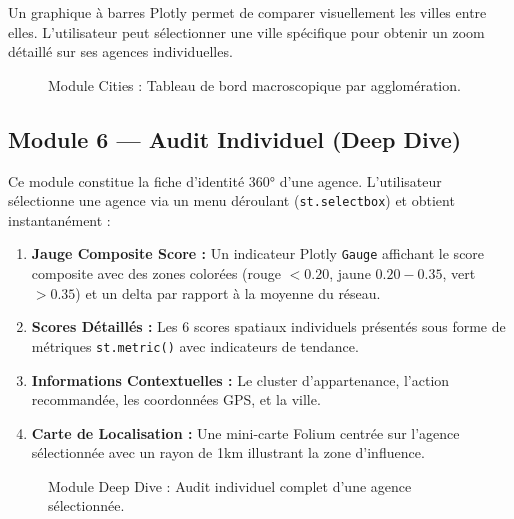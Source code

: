 Un graphique à barres Plotly permet de comparer visuellement les villes entre elles. L'utilisateur peut sélectionner une ville spécifique pour obtenir un zoom détaillé sur ses agences individuelles.

\begin{figure}[h]
    \centering
    \caption{Module Cities : Tableau de bord macroscopique par agglomération.}
    \label{fig:screenshot_cities}
\end{figure}

\subsection{Module 6 — Audit Individuel (Deep Dive)}

Ce module constitue la fiche d'identité 360° d'une agence. L'utilisateur sélectionne une agence via un menu déroulant (\texttt{st.selectbox}) et obtient instantanément :

\begin{enumerate}
    \item \textbf{Jauge Composite Score :} Un indicateur Plotly \texttt{Gauge} affichant le score composite avec des zones colorées (rouge $< 0.20$, jaune $0.20-0.35$, vert $> 0.35$) et un delta par rapport à la moyenne du réseau.
    \item \textbf{Scores Détaillés :} Les 6 scores spatiaux individuels présentés sous forme de métriques \texttt{st.metric()} avec indicateurs de tendance.
    \item \textbf{Informations Contextuelles :} Le cluster d'appartenance, l'action recommandée, les coordonnées GPS, et la ville.
    \item \textbf{Carte de Localisation :} Une mini-carte Folium centrée sur l'agence sélectionnée avec un rayon de 1km illustrant la zone d'influence.
\end{enumerate}

\begin{figure}[h]
    \centering
    \caption{Module Deep Dive : Audit individuel complet d'une agence sélectionnée.}
    \label{fig:screenshot_deepdive}
\end{figure}

